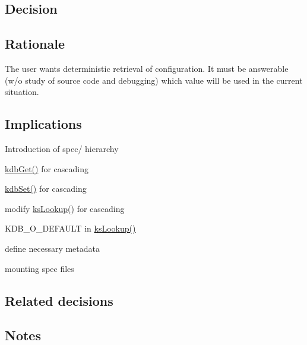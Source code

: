 \subsection*{Decision}

\subsection*{Rationale}


\begin{DoxyItemize}
\item The user wants deterministic retrieval of configuration. It must be answerable (w/o study of source code and debugging) which value will be used in the current situation.
\end{DoxyItemize}

\subsection*{Implications}


\begin{DoxyEnumerate}
\item Introduction of spec/ hierarchy
\item \hyperlink{group__kdb_ga28e385fd9cb7ccfe0b2f1ed2f62453a1}{kdb\+Get()} for cascading
\item \hyperlink{group__kdb_ga11436b058408f83d303ca5e996832bcf}{kdb\+Set()} for cascading
\item modify \hyperlink{group__keyset_gaa34fc43a081e6b01e4120daa6c112004}{ks\+Lookup()} for cascading
\item K\+D\+B\+\_\+\+O\+\_\+\+D\+E\+F\+A\+U\+LT in \hyperlink{group__keyset_gaa34fc43a081e6b01e4120daa6c112004}{ks\+Lookup()}
\item define necessary metadata
\item mounting spec files
\end{DoxyEnumerate}

\subsection*{Related decisions}

\subsection*{Notes}